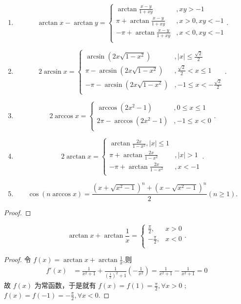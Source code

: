 \documentclass[../../main.tex]{subfiles}
\begin{document}
\begin{theorem}[常用反三角函数性质]
\begin{enumerate}
\item $$\arctan x-\arctan y=\begin{cases}
\arctan \frac{x-y}{1+xy}&,xy>-1\\
\pi +\arctan \frac{x-y}{1+xy}&,x>0,xy<-1\\
-\pi +\arctan \frac{x-y}{1+xy}&,x<0,xy<-1\\
\end{cases}.$$

\item $$2\arcsin x=\begin{cases}
\arcsin \left( 2x\sqrt{1-x^2} \right) &,\left| x \right|\leqslant \frac{\sqrt{2}}{2}\\
\pi -\arcsin \left( 2x\sqrt{1-x^2} \right) &,\frac{\sqrt{2}}{2}<x\leqslant 1\\
-\pi -\arcsin \left( 2x\sqrt{1-x^2} \right) &,-1\leqslant x<-\frac{\sqrt{2}}{2}\\
\end{cases}.$$

\item $$2\arccos x=\begin{cases}
\arccos \left( 2x^2-1 \right) &,0\leqslant x\leqslant 1\\
2\pi -\arccos \left( 2x^2-1 \right) &,-1\leqslant x<0\\
\end{cases}.$$

\item $$2\arctan x=\begin{cases}
\arctan \frac{2x}{1-x^2},\left| x \right|\leqslant 1\\
\pi +\arctan \frac{2x}{1-x^2}&,\left| x \right|>1\\
-\pi +\arctan \frac{2x}{1-x^2}&,x<-1\\
\end{cases}.$$

\item $$\cos \left( n\arccos x \right) =\frac{\left( x+\sqrt{x^2-1} \right) ^n+\left( x-\sqrt{x^2-1} \right) ^n}{2}\left( n\geqslant 1 \right) .$$
\end{enumerate}
\end{theorem}
\begin{proof}

\end{proof}

\begin{proposition}\label{proposition:arctan相关等式}
$$\arctan x+\arctan \frac{1}{x}=\begin{cases}
\frac{\pi}{2},&x>0\\
-\frac{\pi}{2},&x<0\\
\end{cases}.$$
\end{proposition}
\begin{proof}
令 \( f(x)=\arctan x+\arctan\frac{1}{x} \),则
\begin{align*}
f'(x)&=\frac{1}{x^2 + 1}+\frac{1}{(\frac{1}{x})^2 + 1}(-\frac{1}{x^2})=\frac{1}{x^2 + 1}-\frac{1}{x^2 + 1}=0
\end{align*}
故 \( f(x) \) 为常函数，于是就有 \( f(x)=f(1)=\frac{\pi}{2},\forall x>0 \) ;\( f(x)=f(-1)=-\frac{\pi}{2},\forall x<0 \).
\end{proof}
\end{document}
